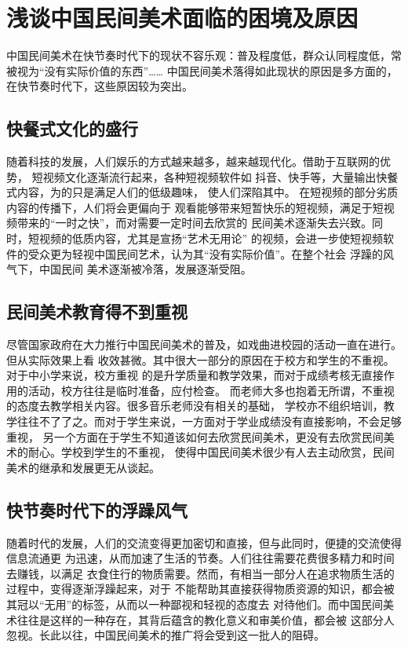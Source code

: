 \section{浅谈中国民间美术面临的困境及原因}
中国民间美术在快节奏时代下的现状不容乐观：普及程度低，群众认同程度低，常被视为“没有实际价值的东西”……
中国民间美术落得如此现状的原因是多方面的，在快节奏时代下，这些原因较为突出。
\subsection{快餐式文化的盛行}
随着科技的发展，人们娱乐的方式越来越多，越来越现代化。借助于互联网的优势，
短视频文化逐渐流行起来，各种短视频软件如
抖音、快手等，大量输出快餐式内容，为的只是满足人们的低级趣味，
使人们深陷其中。
在短视频的部分劣质内容的传播下，人们将会更偏向于
观看能够带来短暂快乐的短视频，满足于短视频带来的“一时之快”，而对需要一定时间去欣赏的
民间美术逐渐失去兴致。同时，短视频的低质内容，尤其是宣扬“艺术无用论”
的视频，会进一步使短视频软件的受众更为轻视中国民间艺术，认为其“没有实际价值”。在整个社会
浮躁的风气下，中国民间
美术逐渐被冷落，发展逐渐受阻。

\subsection{民间美术教育得不到重视}
尽管国家政府在大力推行中国民间美术的普及，如戏曲进校园的活动一直在进行。但从实际效果上看
收效甚微。其中很大一部分的原因在于校方和学生的不重视。对于中小学来说，校方重视
的是升学质量和教学效果，而对于成绩考核无直接作用的活动，校方往往是临时准备，应付检查。
而老师大多也抱着无所谓，不重视的态度去教学相关内容。很多音乐老师没有相关的基础，
学校亦不组织培训，教学往往不了了之。而对于学生来说，一方面对于学业成绩没有直接影响，不会足够重视，
另一个方面在于学生不知道该如何去欣赏民间美术，更没有去欣赏民间美术的耐心。学校到学生的不重视，
使得中国民间美术很少有人去主动欣赏，民间美术的继承和发展更无从谈起。

\subsection{快节奏时代下的浮躁风气}
随着时代的发展，人们的交流变得更加密切和直接，但与此同时，便捷的交流使得信息流通更
为迅速，从而加速了生活的节奏。人们往往需要花费很多精力和时间去赚钱，以满足
衣食住行的物质需要。然而，有相当一部分人在追求物质生活的过程中，变得逐渐浮躁起来，对于
不能帮助其直接获得物质资源的知识，都会被其冠以“无用”的标签，从而以一种鄙视和轻视的态度去
对待他们。而中国民间美术往往是这样的一种存在，其背后蕴含的教化意义和审美价值，都会被
这部分人忽视。长此以往，中国民间美术的推广将会受到这一批人的阻碍。